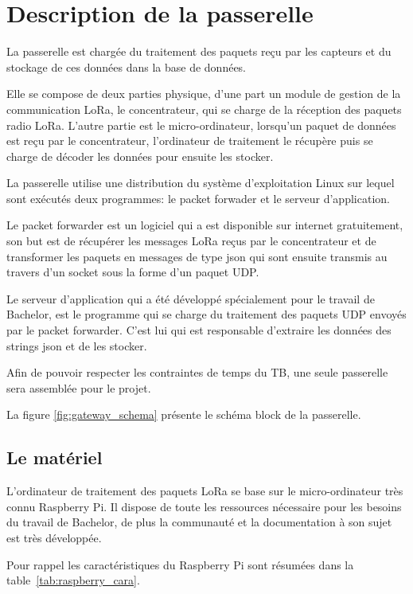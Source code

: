 
\chapter{Description de la passerelle}\label{ch:passerelle}

La passerelle est chargée du traitement des paquets reçu par les capteurs et du stockage de ces données dans la base de données. 

Elle se compose de deux parties physique, d'une part un module de gestion de la communication LoRa, le concentrateur, qui se charge de la réception des paquets radio LoRa. L'autre partie est le micro-ordinateur, lorsqu'un paquet de données est reçu par le concentrateur, l'ordinateur de traitement le récupère puis se charge de décoder les données pour ensuite les stocker.

La passerelle utilise une distribution du système d'exploitation Linux sur lequel sont exécutés deux programmes: le packet forwader et le serveur d'application.

Le packet forwarder est un logiciel qui a est disponible sur internet gratuitement, son but est de récupérer les messages LoRa reçus par le concentrateur et de transformer les paquets en messages de type json qui sont ensuite transmis au travers d'un socket sous la forme d'un paquet UDP.

Le serveur d'application qui a été développé spécialement pour le travail de Bachelor, est le programme qui se charge du traitement des paquets UDP envoyés par le packet forwarder. C'est lui qui est responsable d'extraire les données des strings json et de les stocker.

Afin de pouvoir respecter les contraintes de temps du TB, une seule passerelle sera assemblée pour le projet.

La figure \ref{fig:gateway_schema} présente le schéma block de la passerelle.

\section{Le matériel}

L'ordinateur de traitement des paquets LoRa se base sur le micro-ordinateur très connu Raspberry Pi. Il dispose de toute les ressources nécessaire pour les besoins du travail de Bachelor, de plus la communauté et la documentation à son sujet est très développée.

Pour rappel les caractéristiques du Raspberry Pi sont résumées dans la table~\ref{tab:raspberry_cara}.

